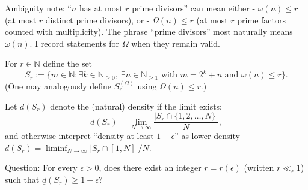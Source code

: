 Ambiguity note: “$n$ has at most $r$ prime divisors” can mean either
- $\omega(n)\le r$ (at most $r$ distinct prime divisors), or
- $\Omega(n)\le r$ (at most $r$ prime factors counted with multiplicity).
The phrase “prime divisors” most naturally means $\omega(n)$. I record statements for $\Omega$ when they remain valid.

For $r\in\mathbb{N}$ define the set
\[
S_r := \{m\in\mathbb{N}: \exists k\in\mathbb{N}_{\ge 0},\ \exists n\in\mathbb{N}_{\ge 1}\text{ with } m=2^k+n \text{ and } \omega(n)\le r\}.
\]
(One may analogously define $S_r^{(\Omega)}$ using $\Omega(n)\le r$.)

Let $d(S_r)$ denote the (natural) density if the limit exists:
\[
d(S_r)=\lim_{N\to\infty}\frac{|S_r\cap\{1,2,\dots,N\}|}{N},
\]
and otherwise interpret “density at least $1-\epsilon$” as lower density $\underline d(S_r)=\liminf_{N\to\infty} |S_r\cap[1,N]|/N$.

Question: For every $\epsilon>0$, does there exist an integer $r=r(\epsilon)$ (written $r\ll_\epsilon 1$) such that $\underline d(S_r)\ge 1-\epsilon$?
